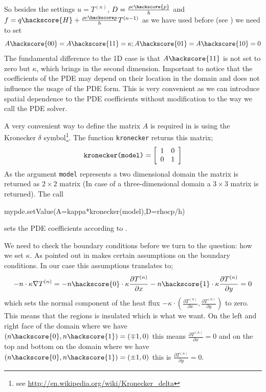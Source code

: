 So besides the settings $u=T^{(n)}$, $D = \frac{\rho c \hackscore{p}}{h}$ and
$f = q \hackscore{H} + \frac{\rho c\hackscore p}{h} T^{(n-1)}$ as we have used before (see ) we need to set
\begin{equation}\label{eqn: kappa general}
A\hackscore{00}=A\hackscore{11}=\kappa; A\hackscore{01}=A\hackscore{10}=0
\end{equation}
The fundamental difference to the 1D case is that $A\hackscore{11}$ is not set to zero but $\kappa$,
which brings in the second dimension. Important to notice that the coefficients 
of the PDE may depend on their location in the domain and does not influence the usage of the PDE form. This is very convenient as we can introduce spatial dependence to the PDE coefficients without modification to the way we call the PDE solver. 

A very convenient way to define the matrix $A$ is required in  is using the 
Kronecker $\delta$ symbol\footnote{see \url{http://en.wikipedia.org/wiki/Kronecker_delta}}. The 
\esc function \verb|kronecker| returns this matrix;
\begin{equation}
\verb|kronecker(model)| = \left[ 
\begin{array}{cc}
 1 & 0 \\
 0 & 1 \\
\end{array}
\right]
\end{equation}
As the argument \verb|model| represents a two dimensional domain the matrix is returned as $2 \times 2$ matrix
(In case of a three-dimensional domain a $3 \times 3$ matrix is returned). The call 
\begin{python}
mypde.setValue(A=kappa*kronecker(model),D=rhocp/h)
\end{python}
sets the PDE coefficients according to .  

We need to check the boundary conditions before we turn to the question: how we set $\kappa$. As
pointed out in  makes certain assumptions on the boundary conditions. In our case
this assumptions translates to;
\begin{equation}
-n \cdot \kappa \nabla T^{(n)} = 
-n\hackscore{0} \cdot \kappa \frac{\partial T^{(n)}}{\partial x} - n\hackscore{1} \cdot  \kappa \frac{\partial T^{(n)}}{\partial y} = 0
\label{eq:hom flux}
\end{equation}
which sets the normal component of the heat flux $- \kappa \cdot (\frac{\partial T^{(n)}}{\partial x}, \frac{\partial T^{(n)}}{\partial y})$ to zero. This means that the regions is insulated which is what we want. 
On the left and right face of the domain where we have $(n\hackscore{0},n\hackscore{1} ) = (\mp 1,0)$ 
this means $\frac{\partial T^{(n)}}{\partial x}=0$ and on the top and bottom on the domain 
where we have  $(n\hackscore{0},n\hackscore{1} ) = (\pm 1,0)$ this is $\frac{\partial T^{(n)}}{\partial y}=0$. 

